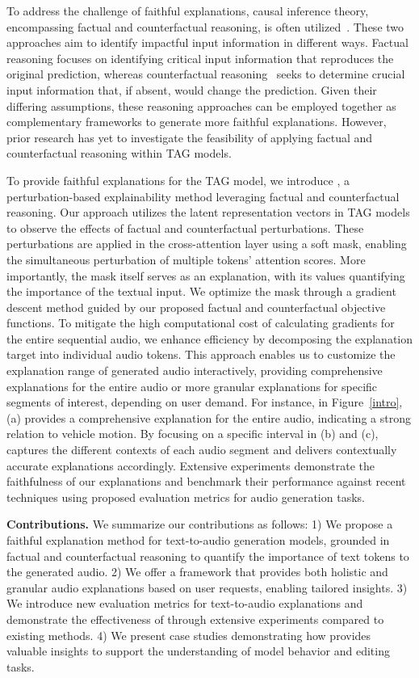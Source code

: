 To address the challenge of faithful explanations, causal inference theory, encompassing factual and counterfactual reasoning, is often utilized~\cite{pearl2009causal}. These two approaches aim to identify impactful input information in different ways. Factual reasoning focuses on identifying critical input information that reproduces the original prediction, whereas counterfactual reasoning~\cite{tan2022learning, ali2023explainable, kenny2021post} seeks to determine crucial input information that, if absent, would change the prediction. Given their differing assumptions, these reasoning approaches can be employed together as complementary frameworks to generate more faithful explanations. However, prior research has yet to investigate the feasibility of applying factual and counterfactual reasoning within TAG models.

To provide faithful explanations for the TAG model, we introduce \mname{}, a perturbation-based explainability method leveraging factual and counterfactual reasoning. Our approach utilizes the latent representation vectors in TAG models to observe the effects of factual and counterfactual perturbations. These perturbations are applied in the cross-attention layer using a soft mask, enabling the simultaneous perturbation of multiple tokens' attention scores. More importantly, the mask itself serves as an explanation, with its values quantifying the importance of the textual input. We optimize the mask through a gradient descent method guided by our proposed factual and counterfactual objective functions. To mitigate the high computational cost of calculating gradients for the entire sequential audio, we enhance efficiency by decomposing the explanation target into individual audio tokens. This approach enables us to customize the explanation range of generated audio interactively, providing comprehensive explanations for the entire audio or more granular explanations for specific segments of interest, depending on user demand. For instance, in Figure~\ref{intro}, (a) provides a comprehensive explanation for the entire audio, indicating a strong relation to vehicle motion. By focusing on a specific interval in (b) and (c), \mname{} captures the different contexts of each audio segment and delivers contextually accurate explanations accordingly. Extensive experiments demonstrate the faithfulness of our explanations and benchmark their performance against recent techniques using proposed evaluation metrics for audio generation tasks.

\textbf{Contributions.} We summarize our contributions as follows: 1) We propose a faithful explanation method for text-to-audio generation models, grounded in factual and counterfactual reasoning to quantify the importance of text tokens to the generated audio. 2) We offer a framework that provides both holistic and granular audio explanations based on user requests, enabling tailored insights. 3) 
We introduce new evaluation metrics for text-to-audio explanations and demonstrate the effectiveness of \mname{}through extensive experiments compared to existing methods. 4) We present case studies demonstrating how \mname{} provides valuable insights to support the understanding of model behavior and editing tasks.